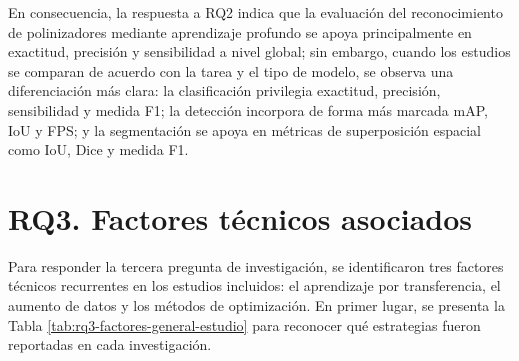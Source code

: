 En consecuencia, la respuesta a RQ2 indica que la evaluación del reconocimiento de polinizadores mediante aprendizaje profundo se apoya principalmente en exactitud, precisión y sensibilidad a nivel global; sin embargo, cuando los estudios se comparan de acuerdo con la tarea y el tipo de modelo, se observa una diferenciación más clara: la clasificación privilegia exactitud, precisión, sensibilidad y medida F1; la detección incorpora de forma más marcada mAP, IoU y FPS; y la segmentación se apoya en métricas de superposición espacial como IoU, Dice y medida F1. 

\section{RQ3. Factores técnicos asociados}

Para responder la tercera pregunta de investigación, se identificaron tres factores técnicos recurrentes en los estudios incluidos: el aprendizaje por transferencia, el aumento de datos y los métodos de optimización. En primer lugar, se presenta la Tabla \ref{tab:rq3-factores-general-estudio} para reconocer qué estrategias fueron reportadas en cada investigación. \\

\begingroup
\newcommand{\marca}{\(\times\)}

\setlength{\tabcolsep}{3pt}
\renewcommand{\arraystretch}{0.95}
\scriptsize

